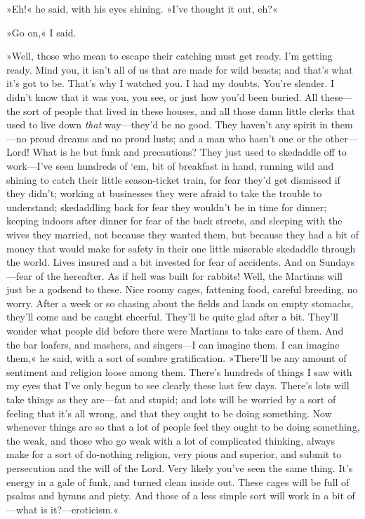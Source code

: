 »Eh!« he said, with his eyes shining. »I've thought it out, eh?«

»Go on,« I said.

»Well, those who mean to escape their catching must get ready. I'm getting ready. Mind you, it isn't all of us that are made for wild beasts; and that's what it's got to be. That's why I watched you. I had my doubts. You're slender. I didn't know that it was you, you see, or just how you'd been buried. All these—the sort of people that lived in these houses, and all those damn little clerks that used to live down \textit{that} way—they'd be no good. They haven't any spirit in them—no proud dreams and no proud lusts; and a man who hasn't one or the other—Lord! What is he but funk and precautions? They just used to skedaddle off to work—I've seen hundreds of `em, bit of breakfast in hand, running wild and shining to catch their little season-ticket train, for fear they'd get dismissed if they didn't; working at businesses they were afraid to take the trouble to understand; skedaddling back for fear they wouldn't be in time for dinner; keeping indoors after dinner for fear of the back streets, and sleeping with the wives they married, not because they wanted them, but because they had a bit of money that would make for safety in their one little miserable skedaddle through the world. Lives insured and a bit invested for fear of accidents. And on Sundays—fear of the hereafter. As if hell was built for rabbits! Well, the Martians will just be a godsend to these. Nice roomy cages, fattening food, careful breeding, no worry. After a week or so chasing about the fields and lands on empty stomachs, they'll come and be caught cheerful. They'll be quite glad after a bit. They'll wonder what people did before there were Martians to take care of them. And the bar loafers, and mashers, and singers—I can imagine them. I can imagine them,« he said, with a sort of sombre gratification. »There'll be any amount of sentiment and religion loose among them. There's hundreds of things I saw with my eyes that I've only begun to see clearly these last few days. There's lots will take things as they are—fat and stupid; and lots will be worried by a sort of feeling that it's all wrong, and that they ought to be doing something. Now whenever things are so that a lot of people feel they ought to be doing something, the weak, and those who go weak with a lot of complicated thinking, always make for a sort of do-nothing religion, very pious and superior, and submit to persecution and the will of the Lord. Very likely you've seen the same thing. It's energy in a gale of funk, and turned clean inside out. These cages will be full of psalms and hymns and piety. And those of a less simple sort will work in a bit of—what is it?—eroticism.«

